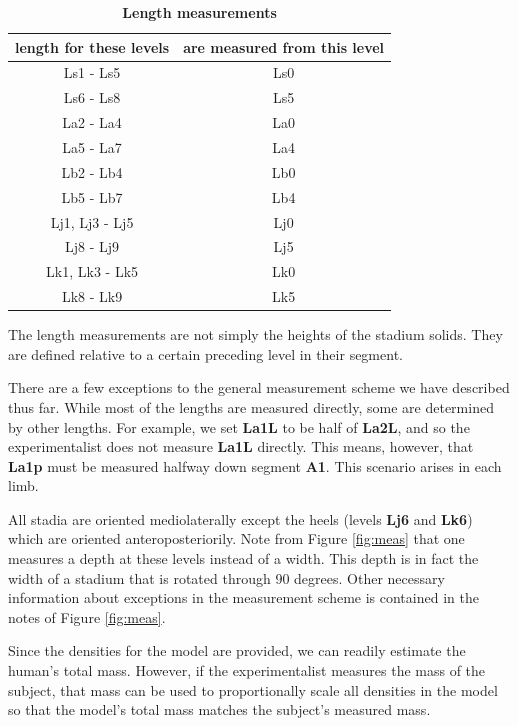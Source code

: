 \documentclass[10pt,a4paper,twocolumn]{article}
\begin{document}
\begin{table}
  \centering
  \caption{
    \bf{Length measurements}
  }
  \begin{tabular}{cc}
    \hline
    \textbf{length for these levels} & \textbf{are measured from this level}\\
    \hline
    Ls1 - Ls5 & Ls0 \\
    Ls6 - Ls8 & Ls5 \\
    La2 - La4 & La0 \\
    La5 - La7 & La4 \\
    Lb2 - Lb4 & Lb0 \\
    Lb5 - Lb7 & Lb4 \\
    Lj1, Lj3 - Lj5 & Lj0 \\
    Lj8 - Lj9 & Lj5  \\
    Lk1, Lk3 - Lk5 & Lk0 \\
    Lk8 - Lk9 & Lk5  \\
  \end{tabular}
  \begin{flushleft}
    The length measurements are not simply the heights of the stadium solids.
    They are defined relative to a certain preceding level in their segment.
  \end{flushleft}
  \label{tab:length}
\end{table}

There are a few exceptions to the general measurement scheme we have described
thus far. While most of the lengths are  measured directly, some are determined
by other lengths. For example, we set \textbf{La1L} to be half of
\textbf{La2L}, and so the experimentalist does not measure \textbf{La1L}
directly. This means, however, that \textbf{La1p} must be measured halfway down
segment \textbf{A1}. This scenario arises in each limb.

All stadia are oriented mediolaterally except the heels (levels \textbf{Lj6}
and \textbf{Lk6}) which are oriented anteroposteriorily.  Note from Figure
\ref{fig:meas} that one measures a depth at these levels instead of a width.
This depth is in fact the width of a stadium that is rotated through 90
degrees. Other necessary information about exceptions in the measurement scheme
is contained in the notes of Figure \ref{fig:meas}.

Since the densities for the model are provided, we can readily estimate the
human's total mass. However, if the experimentalist measures the mass of the
subject, that mass can be used to proportionally scale all densities in the
model so that the model's total mass matches the subject's measured mass.
\end{document}
